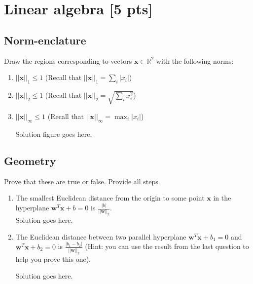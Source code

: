\documentclass[a4paper]{article}
\theoremstyle{definition}
\newcommand{\RR}{\mathbb{R}}
\newenvironment{soln}{
    \leavevmode\color{blue}\ignorespaces
}{}
\begin{document}
\section{Linear algebra [5 pts]}


\subsection{Norm-enclature}
Draw the regions corresponding to vectors $\mathbf{x}\in\RR^2$ with the following norms:
\begin{enumerate}
	\item 	$||\mathbf{x}||_1\leq 1$ (Recall that $||\mathbf{x}||_1 = \sum_i |x_i|$)
	\item 	$||\mathbf{x}||_2 \leq 1$ (Recall that $||\mathbf{x}||_2 =\sqrt{\sum_i x_i^2}$)
	\item 	$||\mathbf{x}||_\infty \leq 1$ (Recall that $||\mathbf{x}||_\infty = \max_i |x_i|$)
	
	\begin{soln}
	    Solution figure goes here.\\
	\end{soln}
\end{enumerate}




\subsection{Geometry}
Prove that these are true or false. Provide all steps.
\begin{enumerate}
\item 	The smallest Euclidean distance from the origin to some point $\mathbf{x}$ in the hyperplane $\mathbf{w}^T\mathbf{x} + b = 0$ is $\frac{|b|}{||\mathbf{w}||_2}$.\\
\begin{soln}  Solution goes here. \end{soln}

\item 	The Euclidean distance between two parallel hyperplane $\mathbf{w}^T\mathbf{x} + b_1 = 0$ and $\mathbf{w}^T\mathbf{x} + b_2 = 0$ is $\frac{|b_1 - b_2|}{||\mathbf{w}||_2}$ (Hint: you can use the result from the last question to help you prove this one).

\begin{soln}  Solution goes here. \end{soln}

\end{enumerate}
\end{document}
